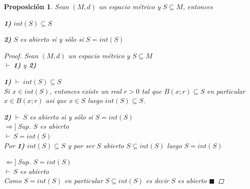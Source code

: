 \documentclass[oneside]{book} %
\theoremstyle{Teorema}
\newtheorem{Proposicion}[Definicion]{Proposición}
\theoremstyle{Ejemplos}
\theoremstyle{[Obs]}
\renewcommand{\{}{\left\lbrace} %
\renewcommand{\}}{\right\rbrace} %
\renewcommand{\sc}{\subseteq} %
\renewcommand{\qed}{$\blacksquare$} %
\newcommand{\pd}{$\vdash\ $} %
\newcommand{\necesidad}{$\Rightarrow]\ $} %
\newcommand{\suficiencia}{$\Leftarrow]\ $} %
\begin{document}
			\begin{Proposicion}\setlength{\parindent}{0em}
				
				Sean $(M, d)$ un espacio métrico y $S \sc M$, entonces

				\textbf{1)} $int(S) \sc S$ 

				\textbf{2)} $S$ es abierto si y sólo si $S = int(S)$ 
				
				\begin{proof}
					
					Sean $(M, d)$ un espacio métrico y $S \sc M$ \\ 
					\pd \textbf{1)} y \textbf{2)}

					\textbf{1)} \pd $int(S) \sc S$ \\ 
					Si $x \in int(S)$, entonces existe un real $r > 0$ tal que $B(x;r) \sc S$ en particular $x \in B(x;r)$ asi que $x \in S$ luego $int(S) \sc S$. 

					\textbf{2)} \pd $S$ es abierto si y sólo si $S = int(S)$ \\ 
					\necesidad Sup. $S$ es abierto \\ 
					\pd $S = int(S)$ \\ 
					Por \textbf{1)} $int(S) \sc S$ y por ser $S$ abierto $S \sc int(S)$ luego $S = int(S)$ 

					\suficiencia Sup. $S = int(S)$ \\ 
					\pd $S$ es abierto \\ 
					Como $S = int(S)$ en particular $S \sc int(S)$ es decir $S$ es abierto \qed

				\end{proof}

			\end{Proposicion}
\end{document}
